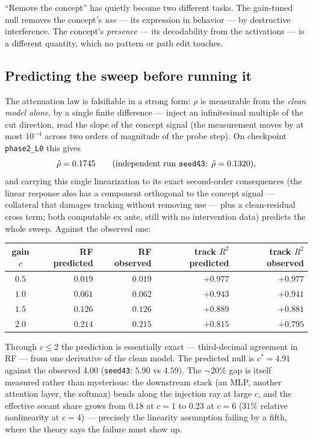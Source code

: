 \documentclass{article}
\begin{document}
``Remove the concept'' has quietly become two different tasks. The gain-tuned null removes the concept's \emph{use} --- its expression in behavior --- by destructive interference. The concept's \emph{presence} --- its decodability from the activations --- is a different quantity, which no pattern or path edit touches.

\subsection{Predicting the sweep before running it}

The attenuation law is falsifiable in a strong form: $\rho$ is measurable from the \emph{clean model alone}, by a single finite difference --- inject an infinitesimal multiple of the cut direction, read the slope of the concept signal (the measurement moves by at most $10^{-4}$ across two orders of magnitude of the probe step). On checkpoint \texttt{phase2\_L0} this gives
\begin{equation*}
    \hat\rho = 0.1745 \qquad (\text{independent run \texttt{seed43}: } \hat\rho = 0.1320),
\end{equation*}
and carrying this single linearization to its exact second-order consequences (the linear response also has a component orthogonal to the concept signal --- collateral that damages tracking without removing use --- plus a clean-residual cross term; both computable ex ante, still with no intervention data) predicts the whole sweep. Against the observed one:

\begin{center}
\begin{tabular}{crrrr}
\toprule
gain $c$ & RF predicted & RF observed & track $R^2$ predicted & track $R^2$ observed \\
\midrule
$0.5$ & $0.019$ & $0.019$ & $+0.977$ & $+0.977$ \\
$1.0$ & $0.061$ & $0.062$ & $+0.943$ & $+0.941$ \\
$1.5$ & $0.126$ & $0.126$ & $+0.889$ & $+0.881$ \\
$2.0$ & $0.214$ & $0.215$ & $+0.815$ & $+0.795$ \\
\bottomrule
\end{tabular}
\end{center}

Through $c \le 2$ the prediction is essentially exact --- third-decimal agreement in RF --- from one derivative of the clean model. The predicted null is $c^* = 4.91$ against the observed $4.00$ (\texttt{seed43}: $5.90$ vs $4.59$). The $\sim 20\%$ gap is itself measured rather than mysterious: the downstream stack (an MLP, another attention layer, the softmax) bends along the injection ray at large $c$, and the effective secant share grows from $0.18$ at $c = 1$ to $0.23$ at $c = 6$ ($31\%$ relative nonlinearity at $c = 4$) --- precisely the linearity assumption failing by a fifth, where the theory says the failure must show up.
\end{document}
